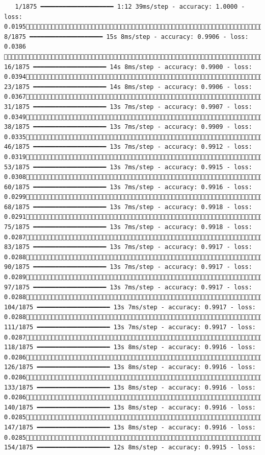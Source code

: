 \documentclass[
  letterpaper,
  DIV=11,
  numbers=noendperiod]{scrreprt}
\begin{document}
\begin{verbatim}
   1/1875 ━━━━━━━━━━━━━━━━━━━━ 1:12 39ms/step - accuracy: 1.0000 - loss: 0.0195   8/1875 ━━━━━━━━━━━━━━━━━━━━ 15s 8ms/step - accuracy: 0.9906 - loss: 0.0386    16/1875 ━━━━━━━━━━━━━━━━━━━━ 14s 8ms/step - accuracy: 0.9900 - loss: 0.0394  23/1875 ━━━━━━━━━━━━━━━━━━━━ 14s 8ms/step - accuracy: 0.9906 - loss: 0.0367  31/1875 ━━━━━━━━━━━━━━━━━━━━ 13s 7ms/step - accuracy: 0.9907 - loss: 0.0349  38/1875 ━━━━━━━━━━━━━━━━━━━━ 13s 7ms/step - accuracy: 0.9909 - loss: 0.0335  46/1875 ━━━━━━━━━━━━━━━━━━━━ 13s 7ms/step - accuracy: 0.9912 - loss: 0.0319  53/1875 ━━━━━━━━━━━━━━━━━━━━ 13s 7ms/step - accuracy: 0.9915 - loss: 0.0308  60/1875 ━━━━━━━━━━━━━━━━━━━━ 13s 7ms/step - accuracy: 0.9916 - loss: 0.0299  68/1875 ━━━━━━━━━━━━━━━━━━━━ 13s 7ms/step - accuracy: 0.9918 - loss: 0.0291  75/1875 ━━━━━━━━━━━━━━━━━━━━ 13s 7ms/step - accuracy: 0.9918 - loss: 0.0287  83/1875 ━━━━━━━━━━━━━━━━━━━━ 13s 7ms/step - accuracy: 0.9917 - loss: 0.0288  90/1875 ━━━━━━━━━━━━━━━━━━━━ 13s 7ms/step - accuracy: 0.9917 - loss: 0.0289  97/1875 ━━━━━━━━━━━━━━━━━━━━ 13s 7ms/step - accuracy: 0.9917 - loss: 0.0288 104/1875 ━━━━━━━━━━━━━━━━━━━━ 13s 7ms/step - accuracy: 0.9917 - loss: 0.0288 111/1875 ━━━━━━━━━━━━━━━━━━━━ 13s 7ms/step - accuracy: 0.9917 - loss: 0.0287 118/1875 ━━━━━━━━━━━━━━━━━━━━ 13s 8ms/step - accuracy: 0.9916 - loss: 0.0286 126/1875 ━━━━━━━━━━━━━━━━━━━━ 13s 8ms/step - accuracy: 0.9916 - loss: 0.0286 133/1875 ━━━━━━━━━━━━━━━━━━━━ 13s 8ms/step - accuracy: 0.9916 - loss: 0.0286 140/1875 ━━━━━━━━━━━━━━━━━━━━ 13s 8ms/step - accuracy: 0.9916 - loss: 0.0285 147/1875 ━━━━━━━━━━━━━━━━━━━━ 13s 8ms/step - accuracy: 0.9916 - loss: 0.0285 154/1875 ━━━━━━━━━━━━━━━━━━━━ 12s 8ms/step - accuracy: 0.9915 - loss: 
\end{verbatim}
\end{document}
